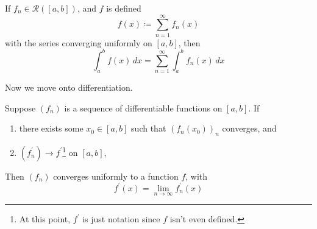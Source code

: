   \begin{corollary}
    If $f_n \in \mathcal{R}([a, b])$, and $f$ is defined 
    \begin{equation}
      f(x) \coloneqq \sum_{n=1}^\infty f_n (x) 
    \end{equation}
    with the series converging uniformly on $[a, b]$, then 
    \begin{equation}
      \int_a^b f(x) \,dx = \sum_{n=1}^\infty \int_a^b f_n (x)\,dx
    \end{equation}
  \end{corollary}

  Now we move onto differentiation. 

  \begin{theorem}
    Suppose $(f_n)$ is a sequence of differentiable functions on $[a, b]$. If 
    \begin{enumerate}
      \item there exists some $x_0 \in [a, b]$ such that $(f_n (x_0))_n$ converges, and 
      \item $(f_n^\prime) \to f^\prime$\footnote{At this point, $f^\prime$ is just notation since $f$ isn't even defined.} on $[a, b]$, 
    \end{enumerate}
    Then $(f_n)$ converges uniformly to a function $f$, with 
    \begin{equation}
      f^\prime (x) = \lim_{n \to \infty} f_n^\prime (x) 
    \end{equation}
  \end{theorem} 
